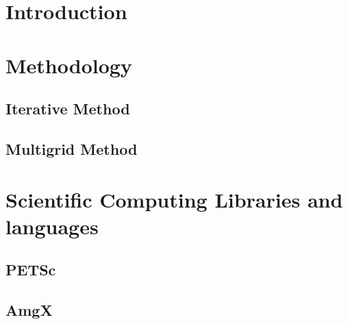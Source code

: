 \chapter{Introduction}


\chapter{Methodology}


\section{Iterative Method}

\section{Multigrid Method}
% 

\chapter{Scientific Computing Libraries and languages}
\section{PETSc}

\section{AmgX}

